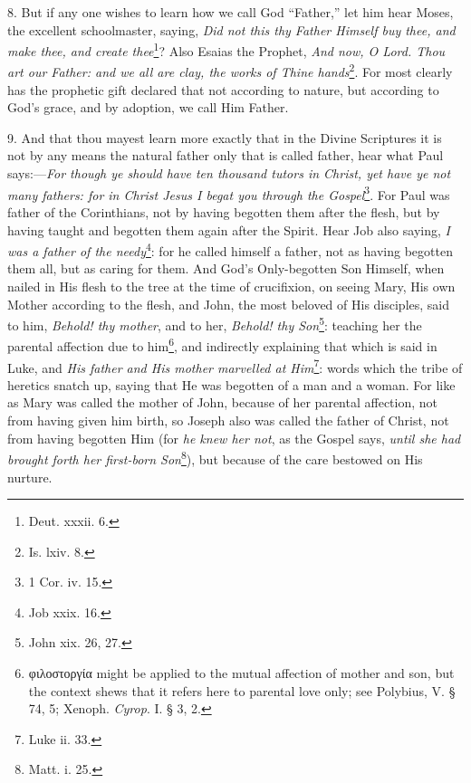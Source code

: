 8. But if any one wishes to learn how we call God “Father,” let him hear Moses, the excellent schoolmaster, saying, \emph{Did not this thy Father Himself buy thee, and make thee, and create thee}\footnote{Deut. xxxii. 6.}? Also Esaias the Prophet, \emph{And now, O Lord. Thou art our Father: and we all are clay, the works of Thine hands}\footnote{Is. lxiv. 8.}. For most clearly has the prophetic gift declared that not according to nature, but according to God’s grace, and by adoption, we call Him Father.

9. And that thou mayest learn more exactly that in the Divine Scriptures it is not by any means the natural father only that is called father, hear what Paul says:—\emph{For though ye should have ten thousand tutors in Christ, yet have ye not many fathers: for in Christ Jesus I begat you through the Gospel}\footnote{1 Cor. iv. 15.}. For Paul was father of the Corinthians, not by having begotten them after the flesh, but by having taught and begotten them again after the Spirit. Hear Job also saying, \emph{I was a father of the needy}\footnote{Job xxix. 16.}: for he called himself a father, not as having begotten them all, but as caring for them. And God’s Only-begotten Son Himself, when nailed in His flesh to the tree at the time of crucifixion, on seeing Mary, His own Mother according to the flesh, and John, the most beloved of His disciples, said to him, \emph{Behold! thy mother}, and to her, \emph{Behold! thy Son}\footnote{John xix. 26, 27.}: teaching her the parental affection due to him\footnote{\textgreek{φιλοστοργία} might be applied to the mutual affection of mother and son, but the context shews that it refers here to parental love only; see Polybius, V. § 74, 5; Xenoph. \emph{Cyrop}. I. § 3, 2.}, and indirectly explaining that which is said in Luke, and \emph{His father and His mother marvelled at Him}\footnote{Luke ii. 33.}: words which the tribe of heretics snatch up, saying that He was begotten of a man and a woman. For like as Mary was called the mother of John, because of her parental affection, not from having given him birth, so Joseph also was called the father of Christ, not from having begotten Him (for \emph{he knew her not}, as the Gospel says, \emph{until she had brought forth her first-born Son}\footnote{Matt. i. 25.}), but because of the care bestowed on His nurture.


